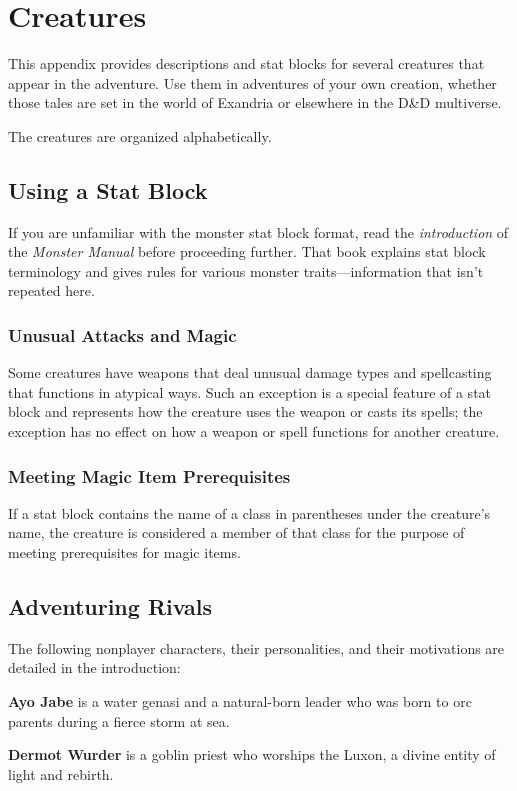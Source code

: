\documentclass[10pt,a4paper,twoside,fancy,bg=print,twocolumn,openany,nodeprecatedcode]{dndbook}
\begin{document}
\appendix
\chapter{Creatures}
This appendix provides descriptions and stat blocks for several creatures that appear in the adventure. Use them in adventures of your own creation, whether those tales are set in the world of Exandria or elsewhere in the D\&D multiverse.

The creatures are organized alphabetically.

\section{Using a Stat Block}
If you are unfamiliar with the monster stat block format, read the \textit{introduction} of the \textit{Monster Manual} before proceeding further. That book explains stat block terminology and gives rules for various monster traits—information that isn't repeated here.

\subsection{Unusual Attacks and Magic}
Some creatures have weapons that deal unusual damage types and spellcasting that functions in atypical ways. Such an exception is a special feature of a stat block and represents how the creature uses the weapon or casts its spells; the exception has no effect on how a weapon or spell functions for another creature.

\subsection{Meeting Magic Item Prerequisites}
If a stat block contains the name of a class in parentheses under the creature's name, the creature is considered a member of that class for the purpose of meeting prerequisites for magic items.

\section{Adventuring Rivals}
The following nonplayer characters, their personalities, and their motivations are detailed in the introduction:

\textbf{Ayo Jabe} is a water genasi and a natural-born leader who was born to orc parents during a fierce storm at sea.

\textbf{Dermot Wurder} is a goblin priest who worships the Luxon, a divine entity of light and rebirth.
\end{document}
